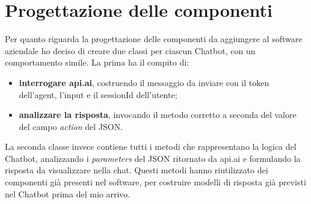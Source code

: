 \section{Progettazione delle componenti}
Per quanto riguarda la progettazione delle componenti da aggiungere al software aziendale ho deciso di creare due classi per ciascun \gls{Chatbot}, con un comportamento simile. La prima ha il compito di:
\begin{itemize}
	\item \textbf{interrogare api.ai}, costruendo il messaggio da inviare con il token dell'agent, l'input e il sessionId dell'utente;
	\item \textbf{analizzare la risposta}, invocando il metodo corretto a seconda del valore del campo \emph{action} del \gls{JSON}.
\end{itemize}
La seconda classe invece contiene tutti i metodi che rappresentano la logica del \gls{Chatbot}, analizzando i \emph{parameters} del \gls{JSON} ritornato da api.ai e formulando la risposta da visualizzare nella chat. Questi metodi hanno riutilizzato dei componenti già presenti nel software, per costruire modelli di risposta già previsti nel \gls{Chatbot} prima del mio arrivo.


